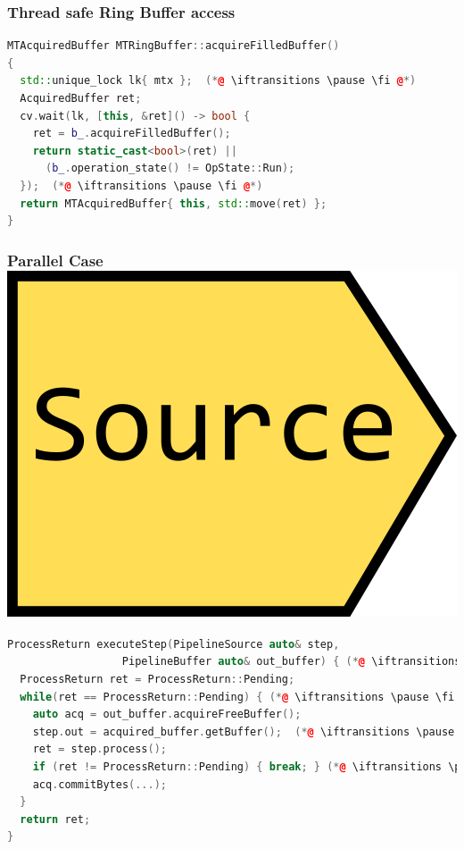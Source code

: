 \documentclass[aspectratio=169]{beamer}
\newif\iftransitions
\begin{document}
\begin{frame}[fragile]
  \frametitle{Thread safe Ring Buffer access}

  \begin{lstlisting}[language={C++}]
MTAcquiredBuffer MTRingBuffer::acquireFilledBuffer()
{
  std::unique_lock lk{ mtx };  (*@ \iftransitions \pause \fi @*)
  AcquiredBuffer ret;
  cv.wait(lk, [this, &ret]() -> bool {
    ret = b_.acquireFilledBuffer();
    return static_cast<bool>(ret) ||
      (b_.operation_state() != OpState::Run);
  });  (*@ \iftransitions \pause \fi @*)
  return MTAcquiredBuffer{ this, std::move(ret) };
}
  \end{lstlisting}
\end{frame}


\begin{frame}[fragile]
  \frametitle{Parallel Case \hspace{320pt} \includegraphics[height=.1\textheight]{pipelinesgfx/source.png}}

  \begin{lstlisting}[language={C++}]
ProcessReturn executeStep(PipelineSource auto& step,
                  PipelineBuffer auto& out_buffer) { (*@ \iftransitions \pause \fi @*)
  ProcessReturn ret = ProcessReturn::Pending;
  while(ret == ProcessReturn::Pending) { (*@ \iftransitions \pause \fi @*)
    auto acq = out_buffer.acquireFreeBuffer();
    step.out = acquired_buffer.getBuffer();  (*@ \iftransitions \pause \fi @*)
    ret = step.process();
    if (ret != ProcessReturn::Pending) { break; } (*@ \iftransitions \pause \fi @*)
    acq.commitBytes(...);
  }
  return ret;
}
  \end{lstlisting}
\end{frame}
\end{document}
